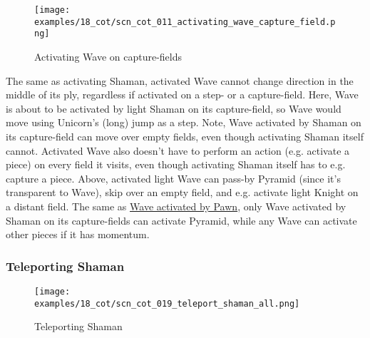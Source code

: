 \vspace*{-0.4\baselineskip}
\noindent
\begin{wrapfigure}[14]{l}{0.4\textwidth}
\centering
\texttt{[image: examples/18\_cot/scn\_cot\_011\_activating\_wave\_capture\_field.png]}
\vspace*{-1.4\baselineskip}
\caption{Activating Wave on capture-fields}
\label{fig:scn_cot_011_activating_wave_capture_field}
\end{wrapfigure}
The same as activating Shaman, activated Wave cannot change direction in the middle
of its ply, regardless if activated on a step- or a capture-field. \newline
\indent
Here, Wave is about to be activated by light Shaman on its capture-field, so Wave
would move using Unicorn's (long) jump as a step. \newline
\indent
Note, Wave activated by Shaman on its capture-field can move over empty fields,
even though activating Shaman itself cannot. Activated Wave also doesn't have to
perform an action (e.g. activate a piece) on every field it visits, even though
activating Shaman itself has to e.g. capture a piece. \newline
\indent
Above, activated light Wave can pass-by Pyramid (since it's transparent to Wave),
skip over an empty field, and e.g. activate light Knight on a distant field. \newline
\indent
The same as \hyperref[fig:scn_mv_19_wave_activation_by_step_pawn]{Wave activated by Pawn},
only Wave activated by Shaman on its capture-fields can activate Pyramid, while
any Wave can activate other pieces if it has momentum.

\clearpage %

\subsubsection*{Teleporting Shaman}
\label{sec:Conquest of Tlalocan/Shaman/Movement/Teleporting Shaman}

\vspace*{-1.4\baselineskip}
\noindent
\begin{figure}[!h]
\texttt{[image: examples/18\_cot/scn\_cot\_019\_teleport\_shaman\_all.png]}
\vspace*{-1.4\baselineskip}
\caption{Teleporting Shaman}
\label{fig:scn_cot_019_teleport_shaman_all}
\end{figure}

